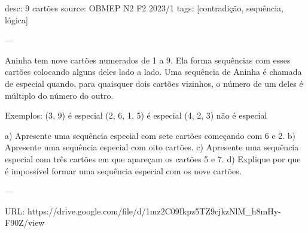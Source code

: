 desc:  $9$ cartões
source:  OBMEP N2 F2 2023/1
tags:  [contradição, sequência, lógica]

---

Aninha tem nove cartões numerados de 1 a 9. Ela forma sequências com esses cartões colocando alguns deles lado a lado. Uma sequência de Aninha é chamada de especial quando, para quaisquer dois cartões vizinhos, o número de um deles é múltiplo do número do outro.

Exemplos:
(3, 9) é especial
(2, 6, 1, 5) é especial
(4, 2, 3) não é especial

a) Apresente uma sequência especial com sete cartões começando com 6 e 2.
b) Apresente uma sequência especial com oito cartões.
c) Apresente uma sequência especial com três cartões em que apareçam os cartões 5 e 7.
d) Explique por que é impossível formar uma sequência especial com os nove cartões.

---

URL: https://drive.google.com/file/d/1mz2C09Ikpz5TZ9cjkzNlM_h8mHy-F90Z/view
